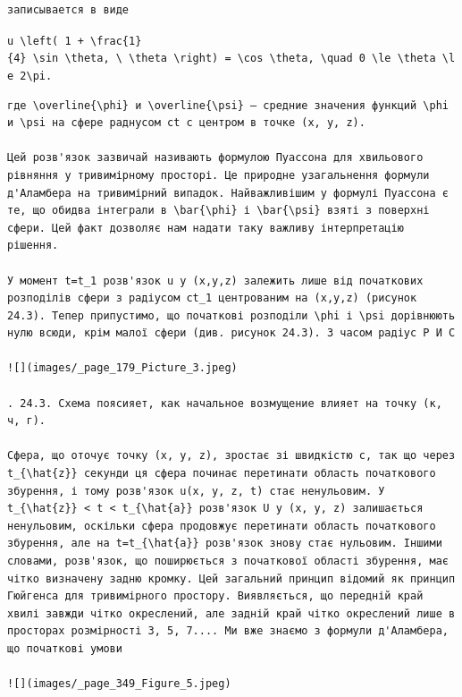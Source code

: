 \documentclass[
  ukrainian,
]{article}
\begin{document}
\begin{verbatim}
записывается в виде
\end{verbatim}

\texttt{u\ \textbackslash{}left(\ 1\ +\ \textbackslash{}frac\{1\}\{4\}\ \textbackslash{}sin\ \textbackslash{}theta,\ \textbackslash{}\ \textbackslash{}theta\ \textbackslash{}right)\ =\ \textbackslash{}cos\ \textbackslash{}theta,\ \textbackslash{}quad\ 0\ \textbackslash{}le\ \textbackslash{}theta\ \textbackslash{}le\ 2\textbackslash{}pi.}

\begin{verbatim}
где \overline{\phi} и \overline{\psi} — средние значения функций \phi и \psi на сфере раднусом ct с центром в точке (x, y, z).

Цей розв'язок зазвичай називають формулою Пуассона для хвильового рівняння у тривимірному просторі. Це природне узагальнення формули д'Аламбера на тривимірний випадок. Найважливішим у формулі Пуассона є те, що обидва інтеграли в \bar{\phi} і \bar{\psi} взяті з поверхні сфери. Цей факт дозволяє нам надати таку важливу інтерпретацію рішення.

У момент t=t_1 розв'язок u у (x,y,z) залежить лише від початкових розподілів сфери з радіусом ct_1 центрованим на (x,y,z) (рисунок 24.3). Тепер припустимо, що початкові розподіли \phi і \psi дорівнюють нулю всюди, крім малої сфери (див. рисунок 24.3). З часом радіус P И С

![](images/_page_179_Picture_3.jpeg)

. 24.3. Схема поясияет, как начальное возмущение влияет на точку (к, ч, г).

Сфера, що оточує точку (x, y, z), зростає зі швидкістю c, так що через t_{\hat{z}} секунди ця сфера починає перетинати область початкового збурення, і тому розв'язок u(x, y, z, t) стає ненульовим. У t_{\hat{z}} < t < t_{\hat{a}} розв'язок U у (x, y, z) залишається ненульовим, оскільки сфера продовжує перетинати область початкового збурення, але на t=t_{\hat{a}} розв'язок знову стає нульовим. Іншими словами, розв'язок, що поширюється з початкової області збурення, має чітко визначену задню кромку. Цей загальний принцип відомий як принцип Гюйгенса для тривимірного простору. Виявляється, що передній край хвилі завжди чітко окреслений, але задній край чітко окреслений лише в просторах розмірності 3, 5, 7.... Ми вже знаємо з формули д'Аламбера, що початкові умови

![](images/_page_349_Figure_5.jpeg)
\end{verbatim}
\end{document}
